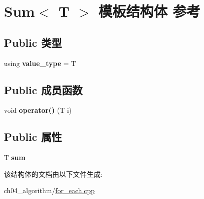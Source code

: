 \hypertarget{struct_sum}{}\section{Sum$<$ T $>$ 模板结构体 参考}
\label{struct_sum}
\subsection*{Public 类型}
\begin{DoxyCompactItemize}
\item 
\mbox{\label{struct_sum_ab668c6c7a82fdea9d6cba5f1586e474c}} 
using {\bfseries value\+\_\+type} = T
\end{DoxyCompactItemize}
\subsection*{Public 成员函数}
\begin{DoxyCompactItemize}
\item 
\mbox{\label{struct_sum_aa604d8a70d46ddd1eca64ad20d20b4f0}} 
void {\bfseries operator()} (T i)
\end{DoxyCompactItemize}
\subsection*{Public 属性}
\begin{DoxyCompactItemize}
\item 
\mbox{\label{struct_sum_a53cb41de8a9add7ad21801293a7349a9}} 
T {\bfseries sum}
\end{DoxyCompactItemize}


该结构体的文档由以下文件生成\+:\begin{DoxyCompactItemize}
\item 
ch04\+\_\+algorithm/\mbox{\hyperlink{for__each_8cpp}{for\+\_\+each.\+cpp}}\end{DoxyCompactItemize}
